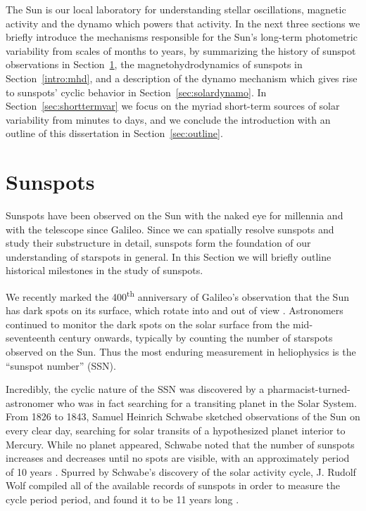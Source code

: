 The Sun is our local laboratory for understanding stellar oscillations, magnetic activity and the dynamo which powers that activity. In the next three sections we briefly introduce the mechanisms responsible for the Sun's long-term photometric variability from scales of months to years, by summarizing the history of sunspot observations in Section~\ref{intro:spots}, the magnetohydrodynamics of sunspots in Section~\ref{intro:mhd}, and a description of the dynamo mechanism which gives rise to sunspots' cyclic behavior in Section~\ref{sec:solardynamo}. In Section~\ref{sec:shorttermvar} we focus on the myriad short-term sources of solar variability from minutes to days, and we conclude the introduction with an outline of this dissertation in Section~\ref{sec:outline}.

\section{Sunspots} \label{intro:spots}

Sunspots have been observed on the Sun with the naked eye for millennia and with the telescope since Galileo. Since we can spatially resolve sunspots and study their substructure in detail, sunspots form the foundation of our understanding of starspots in general. In this Section we will briefly outline historical milestones in the study of sunspots.  

We recently marked the 400\textsuperscript{th} anniversary of Galileo's observation that the Sun has dark spots on its surface, which rotate into and out of view \citep{Galilei1613}. Astronomers continued to monitor the dark spots on the solar surface from the mid-seventeenth century onwards, typically by counting the number of starspots observed on the Sun. Thus the most enduring measurement in heliophysics is the ``sunspot number'' (SSN). 

Incredibly, the cyclic nature of the SSN was discovered by a pharmacist-turned-astronomer who was in fact searching for a transiting planet in the Solar System. From 1826 to 1843, Samuel Heinrich Schwabe sketched observations of the Sun on every clear day, searching for solar transits of a hypothesized planet interior to Mercury. While no planet appeared, Schwabe noted that the number of sunspots increases and decreases until no spots are visible, with an approximately period of 10 years \citep{Schwabe1844}. Spurred by Schwabe's discovery of the solar activity cycle, J. Rudolf Wolf compiled all of the available records of sunspots in order to measure the cycle period period, and found it to be 11 years long \citep{Wolf1852}.


